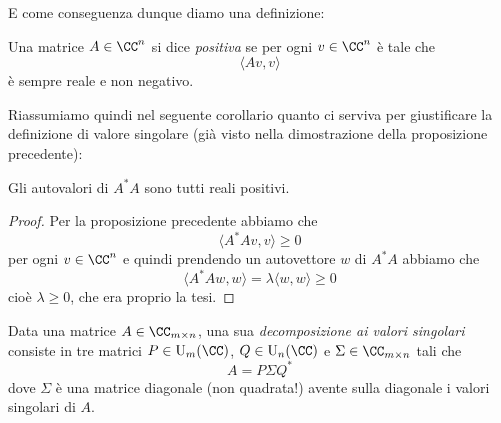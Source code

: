 \documentclass[11pt]{scrartcl}
\begin{document}
   	 E come conseguenza dunque diamo una definizione:
   	 \begin{definition}
   	 	Una matrice $A\in \CC^n$ si dice \textit{positiva} se per ogni $v\in \CC^n$ è tale che
   	 	$$\langle Av,v\rangle$$
   	 	è sempre reale e non negativo.
   	 \end{definition}
   	 Riassumiamo quindi nel seguente corollario quanto ci serviva per giustificare la definizione di valore singolare (già visto nella dimostrazione della proposizione precedente):
   	 \begin{corollary}
   	 	Gli autovalori di $A^*A$ sono tutti reali positivi.
   	 \end{corollary}
   	 \begin{proof}
   	 	Per la proposizione precedente abbiamo che
   	 	$$\langle A^*Av,v\rangle\ge 0$$
   	 	per ogni $v\in \CC^n$ e quindi prendendo un autovettore $w$ di $A^*A$ abbiamo che
   	 	$$\langle A^*Aw,w\rangle = \lambda\langle w,w\rangle \ge 0$$
   	 	cioè $\lambda\ge 0$, che era proprio la tesi.
   	 \end{proof}
   	 \begin{definition}
   	 	Data una matrice $A\in \CC_{m\times n}$, una sua \textit{decomposizione ai valori singolari} consiste in tre matrici $P\in \text{U}_m(\CC)$, $Q\in \text{U}_n(\CC)$ e $\Sigma\in \CC_{m\times n}$ tali che
   	 	$$A=P\Sigma Q^*$$
   	 	dove $\Sigma$ è una matrice diagonale (non quadrata!) avente sulla diagonale i valori singolari di $A$.
   	 \end{definition}
   	 
\end{document}
